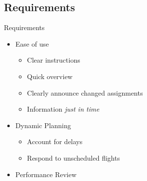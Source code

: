 \subsection{Requirements}
\begin{frame}{Requirements}{}
	\begin{itemize}
		\item Ease of use
		\begin{itemize}
			\item Clear instructions
			\item Quick overview
			\item Clearly announce changed assignments
			\item Information \textit{just in time}
		\end{itemize}
		\item Dynamic Planning
		\begin{itemize}
			\item Account for delays
			\item Respond to unscheduled flights
		\end{itemize}
		\item Performance Review
	\end{itemize}
\end{frame}